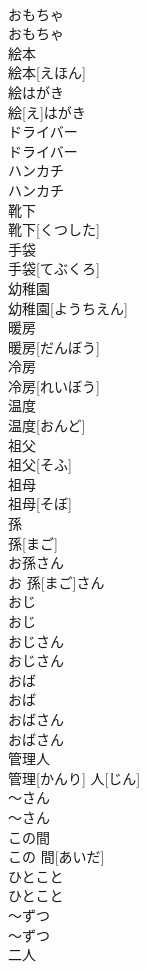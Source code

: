 \documentclass[8pt]{extreport}
\begin{document}
\begin{CJK}{UTF8}{min}
\\	おもちゃ	
\\	おもちゃ	
\\	絵本	
\\	絵本[えほん]	
\\	絵はがき	
\\	絵[え]はがき	
\\	ドライバー	
\\	ドライバー	
\\	ハンカチ	
\\	ハンカチ	
\\	靴下	
\\	靴下[くつした]	
\\	手袋	
\\	手袋[てぶくろ]	
\\	幼稚園	
\\	幼稚園[ようちえん]	
\\	暖房	
\\	暖房[だんぼう]	
\\	冷房	
\\	冷房[れいぼう]	
\\	温度	
\\	温度[おんど]	
\\	祖父	
\\	祖父[そふ]	
\\	祖母	
\\	祖母[そぼ]	
\\	孫	
\\	孫[まご]	
\\	お孫さん	
\\	お 孫[まご]さん	
\\	おじ	
\\	おじ	
\\	おじさん	
\\	おじさん	
\\	おば	
\\	おば	
\\	おばさん	
\\	おばさん	
\\	管理人	
\\	管理[かんり] 人[じん]	
\\	〜さん	
\\	〜さん	
\\	この間	
\\	この 間[あいだ]	
\\	ひとこと	
\\	ひとこと	
\\	〜ずつ	
\\	〜ずつ	
\\	二人	

\end{CJK}
\end{document}

